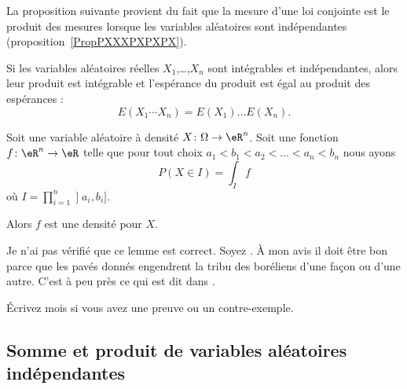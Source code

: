La proposition suivante provient du fait que la mesure d'une loi conjointe est le produit des mesures lorsque les variables aléatoires sont indépendantes (proposition~\ref{PropPXXXPXPXPX}).
\begin{proposition}           \label{PROPooDKQDooREiSSf}
	Si les variables aléatoires réelles \( X_1\),\ldots,\( X_n\) sont intégrables et indépendantes, alors leur produit est intégrable et l'espérance du produit est égal au produit des espérances :
	\begin{equation}
		E(X_1\cdots X_n)=E(X_1)\ldots E(X_n).
	\end{equation}
\end{proposition}

\begin{lemma}       \label{LEMooIVIWooUUVStW}
    Soit une variable aléatoire à densité \( X\colon \Omega\to \eR^n\). Soit une fonction \( f\colon \eR^n\to \eR\) telle que pour tout choix \( a_1<b_1<a_2<\ldots <a_n<b_n\) nous ayons
    \begin{equation}
        P(X\in I)=\int_I f
    \end{equation}
où \( I=\prod_{i=1}^n\mathopen] a_i , b_i \mathclose]\). 

Alors \( f\) est une densité pour \( X\).

\begin{probleme}
    Je n'ai pas vérifié que ce lemme est correct. Soyez . À mon avis il doit être bon parce que les pavés donnés engendrent la tribu des boréliens d'une façon ou d'une autre. C'est à peu près ce qui est dit dans \cite{BIBooMECWooHQJweh}.

    Écrivez mois si vous avez une preuve ou un contre-exemple.
\end{probleme}

\end{lemma}

\subsection{Somme et produit de variables aléatoires indépendantes}
\label{subsecscnvommevariablsindep}


